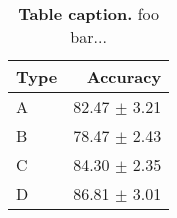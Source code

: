 \begin{table}[ht]
\begin{center}
    \begin{tabular}{|l|r|}
        \hline
        Type & Accuracy\\ \hline
        A    & 82.47 $\pm$ 3.21 \\
        B    & 78.47 $\pm$ 2.43 \\
        C    & 84.30 $\pm$ 2.35 \\
        D    & 86.81 $\pm$ 3.01 \\
        \hline
    \end{tabular}
    \end{center}

    \caption[Table caption]{\textbf{Table caption.} foo bar...\\}
    \label{tab:accuracy}
\end{table}